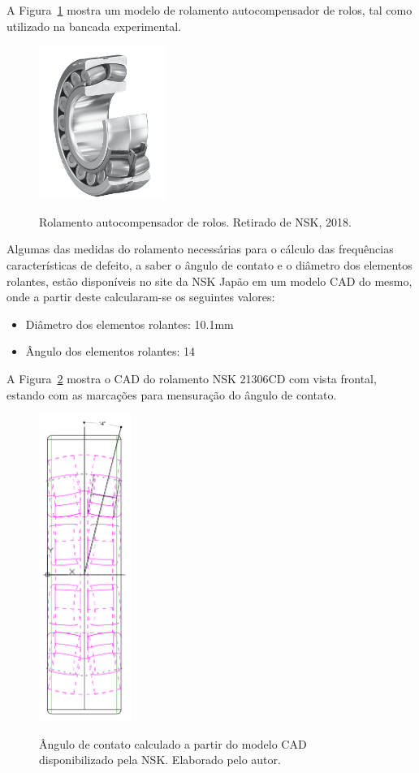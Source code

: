 \documentclass[
	12pt,				
	oneside,			
	a4paper,			
	english,			
	brazil,			
	]{abntex2ppgsi}
\begin{document}
A Figura~\ref{Figura24} mostra um modelo de rolamento autocompensador de rolos, tal como utilizado na bancada experimental.

\begin{figure}[H]
\centering
\caption {Rolamento autocompensador de rolos. Retirado de NSK, 2018.}
\includegraphics[width=\textwidth,height=50mm,keepaspectratio]{Figura24}
\label{Figura24}
\end{figure} 

Algumas das medidas do rolamento necessárias para o cálculo das frequências características de defeito, a saber o ângulo de contato e o diâmetro dos elementos rolantes, estão disponíveis no site da NSK Japão em um modelo CAD do mesmo, onde a partir deste calcularam-se os seguintes valores:

\begin{itemize}
	\item Diâmetro dos elementos rolantes: 10.1\si{\mm}
	\item Ângulo dos elementos rolantes: 14\textdegree
\end{itemize}

A Figura~\ref{angulo_de_contato} mostra o CAD do rolamento NSK 21306CD com vista frontal, estando com as marcações para mensuração do ângulo de contato. 

\begin{figure}[H]
\centering
\caption {Ângulo de contato calculado a partir do modelo CAD disponibilizado pela NSK. Elaborado pelo autor.}
\includegraphics[width=\textwidth,height=100mm,keepaspectratio]{angulo_de_contato}
\label{angulo_de_contato}
\end{figure} 
\end{document}
